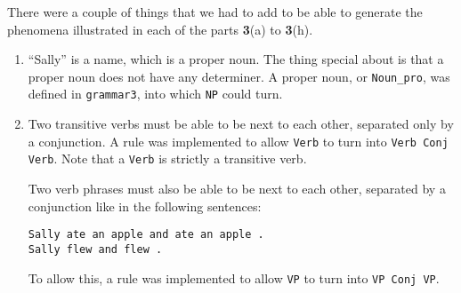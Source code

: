 \documentclass[11pt]{article}
\newcommand{\code}[1]{\texttt{#1}}
\begin{document}
\hspace{-22pt} There were a couple of things that we had to add to be able to generate the phenomena illustrated in each of the parts \textbf{3}(a) to \textbf{3}(h).
\begin{enumerate}
\item 
	``Sally'' is a name, which is a proper noun. The thing special about is that a proper noun does not have any determiner. A proper noun, or \code{Noun\_pro}, was defined in \code{grammar3}, into which \code{NP} could turn. 
\item 
	Two transitive verbs must be able to be next to each other, separated only by a conjunction. A rule was implemented to allow \code{Verb} to turn into \code{Verb Conj Verb}. Note that a \code{Verb} is strictly a transitive verb. 
	
	Two verb phrases must also be able to be next to each other, separated by a conjunction like in the following sentences:
	
	\code{Sally ate an apple and ate an apple .} \\
	\code{Sally flew and flew .}
	
	To allow this, a rule was implemented to allow \code{VP} to turn into \code{VP Conj VP}.
	

\end{enumerate}
\end{document}
